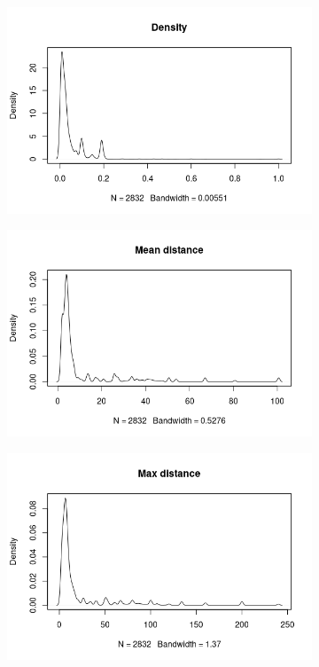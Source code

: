 \documentclass{l4proj}
\theoremstyle{definition}
\theoremstyle{remark}
\begin{document}
\begin{figure}
\begin{subfigure}[t]{0.49\textwidth}
  \end{subfigure}
  \begin{subfigure}[t]{0.49\textwidth}
    \centering
    \includegraphics[width=\textwidth]{images/sip_density.png}
  \end{subfigure}
  \begin{subfigure}[t]{0.49\textwidth}
    \centering
    \includegraphics[width=\textwidth]{images/sip_meandist.png}
  \end{subfigure}
  \begin{subfigure}[t]{0.49\textwidth}
    \centering
    \includegraphics[width=\textwidth]{images/sip_maxdist.png}

\end{subfigure}
\end{figure}
\end{document}
